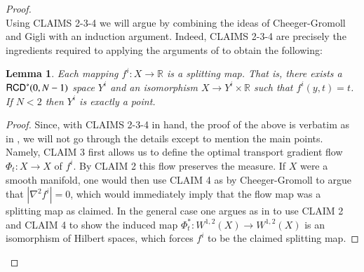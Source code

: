 \documentclass[11pt,reqno]{amsart}
\newcommand{\mm}{\mathfrak m}
\renewcommand{\d}{{\rm{d}}}
\newcommand{\R}{\mathbb{R}}
\newcommand{\RCD}{{\sf RCD}}
\newtheorem{lemma}[theorem]{Lemma}
\theoremstyle{definition}
\theoremstyle{remark}
\theoremstyle{remark}
\theoremstyle{remark}
\theoremstyle{remark}
\theoremstyle{remark}
\theoremstyle{remark}
\theoremstyle{remark}
\begin{document}
\begin{proof}
\\

Using CLAIMS 2-3-4 we will argue by combining the ideas of Cheeger-Gromoll and Gigli \cite{GigliSplitting} with an induction argument.  Indeed, CLAIMS 2-3-4 are precisely the ingredients required to applying the arguments of  \cite{GigliSplitting} to obtain the following:

\begin{lemma}\label{l:splitting}
Each mapping $f^i:X\to \R$ is a splitting map.  That is, there exists a $\RCD^*(0,N-1)$ space $Y^i$ and an isomorphism $X\to Y^i\times\R$ such that $f^i(y,t)=t$.  If $N<2$ then $Y^i$ is exactly a point.
\end{lemma}
\begin{proof}
Since, with CLAIMS 2-3-4 in hand, the proof of the above is verbatim as in \cite{GigliSplitting},  we will not go through the details except to mention the main points.  Namely, CLAIM 3 first allows us to define the optimal transport gradient flow $\Phi_t:X\to X$ of $f^i$.  By CLAIM 2 this flow preserves the measure.  If $X$ were a smooth manifold, one would then use CLAIM 4 as by Cheeger-Gromoll to argue that $|\nabla^2 f^i|=0$, which would immediately imply that the flow map was a splitting map as claimed.  In the general case one argues  as in \cite{GigliSplitting} to use CLAIM 2 and CLAIM 4 to show the induced map $\Phi^*_t:W^{1,2}(X)\to W^{1,2}(X)$ is an isomorphism of Hilbert spaces, which forces $f^i$ to be the claimed splitting map.
\end{proof}


\end{proof}
\end{document}
